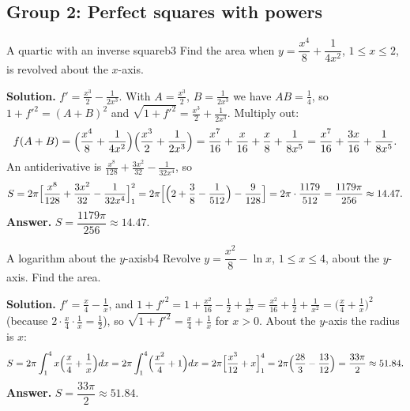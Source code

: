 \documentclass[11pt]{article}
\begin{document}
\subsection*{Group 2: Perfect squares with powers}

\begin{exmp}{A quartic with an inverse square}{b3}
Find the area when $y=\dfrac{x^4}8+\dfrac1{4x^2}$, $1\le x\le2$, is revolved about the $x$-axis.

\textbf{Solution.} $f'=\frac{x^3}2-\frac1{2x^3}$. With $A=\frac{x^3}2$, $B=\frac1{2x^3}$ we have $AB=\frac14$, so $1+f'^2=(A+B)^2$ and $\sqrt{1+f'^2}=\frac{x^3}2+\frac1{2x^3}$. Multiply out:
\[
f(A+B)=\Bigl(\frac{x^4}8+\frac1{4x^2}\Bigr)\Bigl(\frac{x^3}2+\frac1{2x^3}\Bigr)=\frac{x^7}{16}+\frac x{16}+\frac x8+\frac1{8x^5}=\frac{x^7}{16}+\frac{3x}{16}+\frac1{8x^5}.
\]
An antiderivative is $\frac{x^8}{128}+\frac{3x^2}{32}-\frac1{32x^4}$, so
\[
S=2\pi\Bigl[\frac{x^8}{128}+\frac{3x^2}{32}-\frac1{32x^4}\Bigr]_1^2=2\pi\Bigl[\Bigl(2+\frac38-\frac1{512}\Bigr)-\frac9{128}\Bigr]=2\pi\cdot\frac{1179}{512}=\frac{1179\pi}{256}\approx14.47 .
\]
\textbf{Answer.} $S=\dfrac{1179\pi}{256}\approx14.47$.
\end{exmp}

\begin{exmp}{A logarithm about the $y$-axis}{b4}
Revolve $y=\dfrac{x^2}8-\ln x$, $1\le x\le4$, about the $y$-axis. Find the area.

\textbf{Solution.} $f'=\frac x4-\frac1x$, and $1+f'^2=1+\frac{x^2}{16}-\frac12+\frac1{x^2}=\frac{x^2}{16}+\frac12+\frac1{x^2}=\bigl(\frac x4+\frac1x\bigr)^2$ (because $2\cdot\frac x4\cdot\frac1x=\frac12$), so $\sqrt{1+f'^2}=\frac x4+\frac1x$ for $x>0$. About the $y$-axis the radius is $x$:
\[
S=2\pi\int_1^4x\Bigl(\frac x4+\frac1x\Bigr)dx=2\pi\int_1^4\Bigl(\frac{x^2}4+1\Bigr)dx=2\pi\Bigl[\frac{x^3}{12}+x\Bigr]_1^4=2\pi\Bigl(\frac{28}3-\frac{13}{12}\Bigr)=\frac{33\pi}2\approx51.84 .
\]
\textbf{Answer.} $S=\dfrac{33\pi}2\approx51.84$.
\end{exmp}
\end{document}

